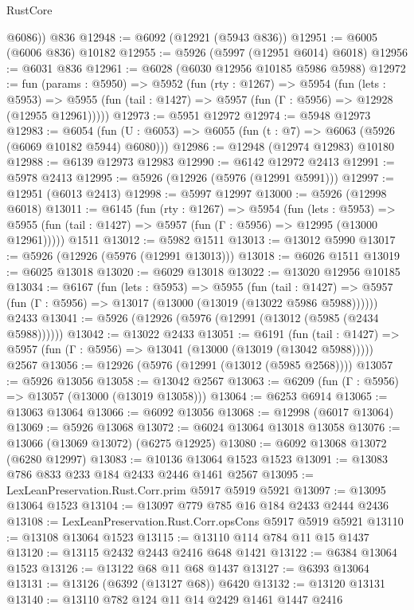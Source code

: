\begin{lexlean}{RustCore}
\begin{coremodule}
        @6086))
    @836
@12948 := @6092 (@12921 (@5943 @836))
@12951 := @6005 (@6006 @836) @10182
@12955 := @5926 (@5997 (@12951 @6014) @6018)
@12956 := @6031 @836
@12961 := @6028 (@6030 @12956 @10185 @5986 @5988)
@12972 := fun (params : @5950) =>
  @5952
    (fun (rty : @1267) =>
    @5954
      (fun (lets : @5953) =>
      @5955 (fun (tail : @1427) => @5957 (fun (Γ : @5956) => @12928 (@12955 @12961)))))
@12973 := @5951 @12972
@12974 := @5948 @12973
@12983 := @6054
    (fun (U : @6053) => @6055 (fun (t : @7) => @6063 (@5926 (@6069 @10182 @5944) @6080)))
@12986 := @12948 (@12974 @12983) @10180
@12988 := @6139 @12973 @12983
@12990 := @6142 @12972 @2413
@12991 := @5978 @2413
@12995 := @5926 (@12926 (@5976 (@12991 @5991)))
@12997 := @12951 (@6013 @2413)
@12998 := @5997 @12997
@13000 := @5926 (@12998 @6018)
@13011 := @6145
    (fun (rty : @1267) =>
    @5954
      (fun (lets : @5953) =>
      @5955 (fun (tail : @1427) => @5957 (fun (Γ : @5956) => @12995 (@13000 @12961)))))
    @1511
@13012 := @5982 @1511
@13013 := @13012 @5990
@13017 := @5926 (@12926 (@5976 (@12991 @13013)))
@13018 := @6026 @1511
@13019 := @6025 @13018
@13020 := @6029 @13018
@13022 := @13020 @12956 @10185
@13034 := @6167
    (fun (lets : @5953) =>
    @5955
      (fun (tail : @1427) =>
      @5957 (fun (Γ : @5956) => @13017 (@13000 (@13019 (@13022 @5986 @5988))))))
    @2433
@13041 := @5926 (@12926 (@5976 (@12991 (@13012 (@5985 (@2434 @5988))))))
@13042 := @13022 @2433
@13051 := @6191
    (fun (tail : @1427) => @5957 (fun (Γ : @5956) => @13041 (@13000 (@13019 (@13042 @5988)))))
    @2567
@13056 := @12926 (@5976 (@12991 (@13012 (@5985 @2568))))
@13057 := @5926 @13056
@13058 := @13042 @2567
@13063 := @6209 (fun (Γ : @5956) => @13057 (@13000 (@13019 @13058)))
@13064 := @6253 @6914
@13065 := @13063 @13064
@13066 := @6092 @13056
@13068 := @12998 (@6017 @13064)
@13069 := @5926 @13068
@13072 := @6024 @13064 @13018 @13058
@13076 := @13066 (@13069 @13072) (@6275 @12925)
@13080 := @6092 @13068 @13072 (@6280 @12997)
@13083 := @10136 @13064 @1523 @1523
@13091 := @13083 @786 @833 @233 @184 @2433 @2446 @1461 @2567
@13095 := LexLeanPreservation.Rust.Corr.prim @5917 @5919 @5921
@13097 := @13095 @13064 @1523
@13104 := @13097 @779 @785 @16 @184 @2433 @2444 @2436
@13108 := LexLeanPreservation.Rust.Corr.opsCons @5917 @5919 @5921
@13110 := @13108 @13064 @1523
@13115 := @13110 @114 @784 @11 @15 @1437
@13120 := @13115 @2432 @2443 @2416 @648 @1421
@13122 := @6384 @13064 @1523
@13126 := @13122 @68 @11 @68 @1437
@13127 := @6393 @13064
@13131 := @13126 (@6392 (@13127 @68)) @6420
@13132 := @13120 @13131
@13140 := @13110 @782 @124 @11 @14 @2429 @1461 @1447 @2416

\end{coremodule}
\end{lexlean}
